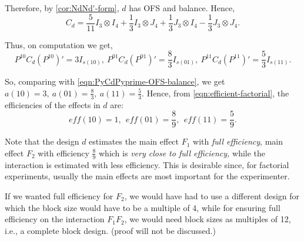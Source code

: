\documentclass[12pt]{article}
\theoremstyle{definition}
\newenvironment{note}{
\begin{tcolorbox}[colback=blue!5!white,colframe=blue!75!black,title=Note, parbox = false] }{\end{tcolorbox} }
\newenvironment{example}[1][\unskip]{
\begin{tcolorbox}[colback=blue!5!white,colframe=blue!75!black, title = {Example #1}, parbox = false] }{\end{tcolorbox} }
\begin{document}
\begin{example}

Therefore, by \cref{cor:NdNd'-form}, $d$ has OFS and balance. Hence,  $$C_d = \frac{5}{11}I_3\otimes I_4  + \frac{1}{3}I_3\otimes J_4 + \frac{1}{3}J_3 \otimes I_4  - \frac{1}{3}J_3\otimes J_4.$$

Thus, on computation we get, $$P^{10}C_d(P^{10})' = 3 I_{s(10)}, \  P^{01}C_d(P^{01})' = \frac{8}{3} I_{s(01)}, \ P^{11}C_d(P^{11})' = \frac{5}{3} I_{s(11)}.$$

So, comparing with \eqref{eqn:PyCdPyprime-OFS-balance}, we get  $a(10) = 3, \ a(01) = \frac{8}{3}, \ a(11) = \frac{5}{3}.$ Hence, from \eqref{eqn:efficient-factorial},  the efficiencies of the effects in $d$  are:
$$eff(10) = 1, \ \ eff(01) = \frac{8}{9}, \ \ eff(11)= \frac{5}{9}.$$  

Note that  the design $d$ estimates the main effect $F_1$ with \textit{full efficiency},  main effect $F_2$  with efficiency $\frac{8}{9}$ which is \textit{very close to full efficiency,} while the interaction is estimated with less efficiency. This is desirable since, for factorial experiments, usually the main effects are most important for the experimenter.  
\end{example}

\begin{note}
    If we wanted full efficiency for $F_2$, we would have had to use a different design for which the block size would have to be a multiple of 4, while for ensuring full efficiency on the interaction $F_1F_2$, we would need block sizes as multiples of 12, i.e., a complete block design. (proof will not be discussed.)
\end{note}
\end{document}

